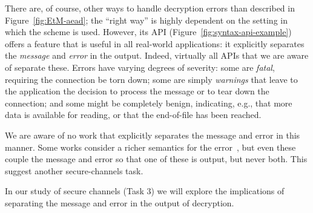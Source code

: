 
There are, of course, other ways to handle decryption errors than described in
Figure~\ref{fig:EtM-aead}; the ``right way'' is highly dependent on the setting
in which the scheme is used. However, its API
(Figure~\ref{fig:syntax-api-example}) offers a feature that is useful in all
real-world applications: it explicitly separates the \emph{message} and
\emph{error} in the output.
%
Indeed, virtually all APIs that we are aware of separate these.  Errors have
varying degrees of severity: some are \emph{fatal}, requiring the connection be
torn down; some are simply \emph{warnings} that leave to the application the
decision to process the message or to tear down the connection; and some might
be completely benign, indicating, e.g., that more data is available for reading,
or that the end-of-file has been reached.

We are aware of no work that explicitly separates the message and error in this
manner.
%
Some works consider a richer semantics for the error~\cite{BDPS13,FPMG15}, but
even these couple the message and error so that one of these is output, but
never both.  This suggest another secure-channels task.

\begin{task}
  In our study of secure channels (Task 3) we will explore the implications of
  separating the message and error in the output of decryption.
\end{task}



